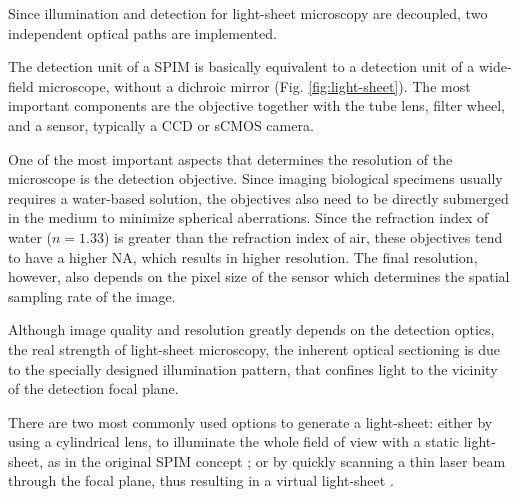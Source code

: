 

    Since illumination and detection for light-sheet microscopy are decoupled, two independent optical paths are implemented.
    
    The detection unit of a SPIM is basically equivalent to a detection unit of a wide-field microscope, without a dichroic mirror (Fig. \ref{fig:light-sheet}). The most important components are the objective together with the tube lens, filter wheel, and a sensor, typically a CCD or sCMOS camera.

    One of the most important aspects that determines the resolution of the microscope is the detection objective. Since imaging biological specimens usually requires a water-based solution, the objectives also need to be directly submerged in the medium to minimize spherical aberrations. Since the refraction index of water ($n=1.33$) is greater than the refraction index of air, these objectives tend to have a higher NA, which results in higher resolution. The final resolution, however, also depends on the pixel size of the sensor which determines the spatial sampling rate of the image.

    Although image quality and resolution greatly depends on the detection optics, the real strength of light-sheet microscopy, the inherent optical sectioning is due to the specially designed illumination pattern, that confines light to the vicinity of the detection focal plane.

    There are two most commonly used options to generate a light-sheet: either by using a cylindrical lens, to illuminate the whole field of view with a static light-sheet, as in the original SPIM concept \cite{huisken_optical_2004}; or by quickly scanning a thin laser beam through the focal plane, thus resulting in a virtual light-sheet \cite{keller_reconstruction_2008}.


